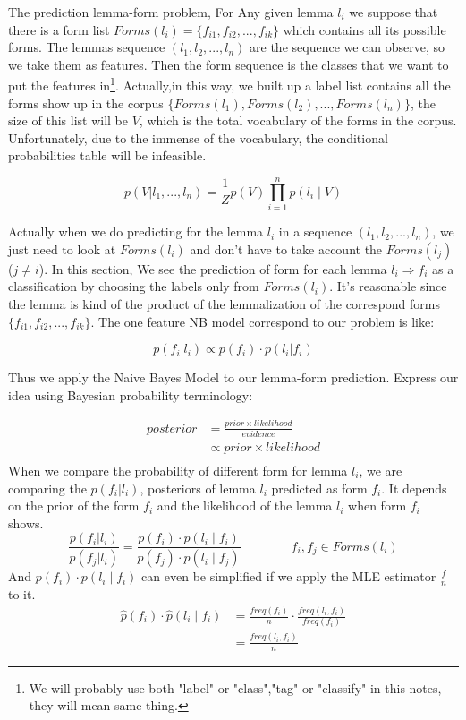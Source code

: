 \documentclass[a4paper]{article}
\begin{document}
The prediction lemma-form problem, For Any given lemma $l_i$ we suppose that there is a form list $Forms(l_i)=\{f_{i1},f_{i2},...,f_{ik}\}$ which contains all its possible forms. The lemmas sequence $(l_1,l_2,...,l_n)$ are the sequence we can observe, so we take them as features. Then the form sequence is the classes that we want to put the features in\footnote{We will probably use both "label" or "class","tag" or "classify" in this notes, they will mean same thing.}. Actually,in this way,  we built up a label list contains all the forms show up in the corpus $\{Forms(l_1),Forms(l_2),..., Forms(l_n)\}$, the size of this list will be $V$, which is the total vocabulary of the forms in the corpus. Unfortunately, due to the immense of the vocabulary, the conditional probabilities table will be infeasible.

\[p(V|l_1,...,l_n) = \frac{1}{Z} p(V) \prod _{i=1}^{n}p(l_i \mid V) \]

Actually when we do predicting for the lemma $l_i$ in a sequence $(l_1,l_2,...,l_n)$, we just need to look at $Forms(l_i)$ and don't have to take account the $Forms(l_j)$ ($j \neq i$). In this section, We see the prediction of form for each lemma $l_i  \Longrightarrow f_i$ as a classification by choosing the labels only from $Forms(l_i)$. It's reasonable since the lemma is kind of the product of the lemmalization of the correspond forms $\{f_{i1},f_{i2},...,f_{ik}\}$. The one feature NB model correspond to our problem is like:

\[p(f_i|l_i) \propto p(f_i) \cdot  p(l_i|f_i)\]

Thus we apply the Naive Bayes Model to our lemma-form prediction. Express our idea using Bayesian probability terminology:

\begin{align*}
posterior  &= \frac{prior \times likelihood}{evidence} \\
           &\propto  prior \times likelihood \\
\end{align*}
When we compare the probability of different form for lemma $l_i$, we are comparing the $p(f_i|l_i)$, posteriors  of lemma $l_i$ predicted as form $f_i$. It depends on the prior of the form $f_i$ and the likelihood of the lemma $l_i$ when form $f_i$ shows.
\begin{equation}
\frac{p(f_i|l_i)}{p(f_j|l_i)} = \frac{p(f_i) \cdot p(l_i \mid f_i)}{  p(f_j) \cdot p(l_i \mid f_j) } \qquad \qquad  f_i,f_j \in Forms(l_i)
\end{equation}
And $p(f_i) \cdot p(l_i \mid f_i)$ can even be simplified if we apply the MLE estimator $\frac{f}{n}$ to it.
\begin{equation} 
\label{eq:simple_mle}
\begin{aligned}
\hat{p}(f_i) \cdot \hat{p}(l_i \mid f_i) &= \frac{freq(f_i)}{n} \cdot \frac{freq(l_i, f_i)}{freq(f_i)} \\
&= \frac{freq(l_i, f_i)}{n}
\end{aligned}
\end{equation}
\end{document}
